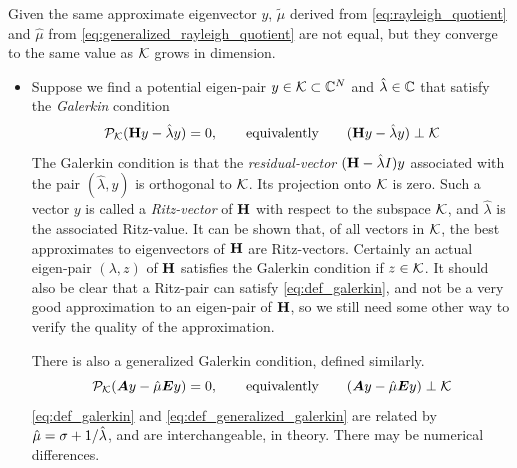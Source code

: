 Given the same approximate eigenvector $y$, $\tilde{\mu}$  derived from \eqref{eq:rayleigh_quotient} and $\hat{\mu}$ from  \eqref{eq:generalized_rayleigh_quotient}
are not equal, but they converge to the same value as $\mathcal{K}$ grows in dimension.

\begin{itemize}
\item Suppose we find a potential eigen-pair $y\in \mathcal{K} \subset \mathbb{C}^N$ and  $\hat{\lambda}\in \mathbb{C}$ that satisfy the \emph{Galerkin} condition
\begin{equation}
\mathcal{P}_{\mathcal{K}} (\textbf{\textup{H}} y - \hat{\lambda} y) = 0, \qquad\text{equivalently} \qquad 
 (\textbf{\textup{H}} y - \hat{\lambda} y) \perp \mathcal{K}
\label{eq:def_galerkin}
\end{equation}
The Galerkin condition  is that the \emph{residual-vector} $(\textbf{\textup{H}}  - \hat{\lambda}I)y$ associated with the pair $(\hat{\lambda},y)$ is orthogonal to $\mathcal{K}$.  Its projection onto $\mathcal{K}$ is zero.  Such a vector $y$ is called a \emph{Ritz-vector}  of $\textbf{\textup{H}}$ with respect to the subspace $\mathcal{K}$, and $\hat{\lambda}$ is the associated Ritz-value.  It can be shown that, of all vectors in $\mathcal{K}$, the best approximates to eigenvectors of $\textbf{\textup{H}}$ are Ritz-vectors.  Certainly an actual eigen-pair $(\lambda,z)$ of $\textbf{\textup{H}}$ satisfies the Galerkin condition if $z \in \mathcal{K}$.  It should also be clear that a Ritz-pair can satisfy \eqref{eq:def_galerkin}, and not be a very good approximation to an eigen-pair of $\textbf{\textup{H}}$, so we still need some other way to verify the quality of the approximation.

There is also a generalized Galerkin condition, defined similarly.
    \begin{equation}
\mathcal{P}_{\mathcal{K}} (\bm{A} y - \hat{\mu} \bm{E} y) = 0, \qquad\text{equivalently} \qquad 
 (\bm{A} y - \hat{\mu} \bm{E} y) \perp \mathcal{K}
\label{eq:def_generalized_galerkin}
\end{equation}
 \eqref{eq:def_galerkin} and \eqref{eq:def_generalized_galerkin} are related by $\hat{\mu}=\sigma+1/\hat{\lambda}$, and are interchangeable, in theory.  There may be numerical differences.  
\end{itemize}


